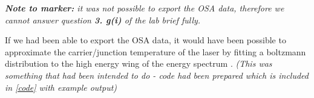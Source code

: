 \documentclass[12pt,a4paper]{report}
\begin{document}
\textit{\textbf{Note to marker:} it was not possible to export the OSA data, therefore we cannot answer question \textbf{3. g(i)} of the lab brief fully.}

If we had been able to export the OSA data, it would have been possible to approximate the carrier/junction temperature of the laser by fitting a boltzmann distribution to the high energy wing of the energy spectrum \cite{energy}. \emph{(This was something that had been intended to do - code had been prepared which is included in \ref{code} with example output)}

\begin{figure}
    \centering
    \quad
    \quad
    \quad

\end{figure}
\end{document}
